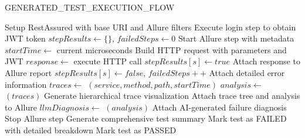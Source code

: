 \documentclass[conference]{IEEEtran}
\begin{document}
\begin{algorithm}[tb]
\caption{GENERATED\_TEST\_EXECUTION\_FLOW}\label{alg:execute}
\footnotesize
\begin{algorithmic}[1]
\Require{}
\Ensure{}
\State Setup RestAssured with base URI and Allure filters
    \State Execute login step to obtain JWT token
    \State $stepResults \gets \{\}$, $failedSteps \gets 0$
        \State Start Allure step with metadata
        \State $startTime \gets$ current microseconds
        \State Build HTTP request with parameters and JWT
        \State $response \gets$ execute HTTP call
            \State $stepResults[s] \gets true$
            \State Attach response to Allure report
        \Else
            \State $stepResults[s] \gets false$, $failedSteps++$
            \State Attach detailed error information
        \EndIf
        \State $traces \gets$ $(service, method, path, startTime)$
            \State $analysis \gets$ $(traces)$
            \State Generate hierarchical trace visualization
            \State Attach trace tree and analysis to Allure
                \State $llmDiagnosis \gets$ $(analysis)$
                \State Attach AI-generated failure diagnosis
            \EndIf
        \EndIf
        \State Stop Allure step
    \EndFor
    \State Generate comprehensive test summary
        \State Mark test as FAILED with detailed breakdown
    \Else
        \State Mark test as PASSED
    \EndIf
\EndFor
\end{algorithmic}
\end{algorithm}
\end{document}
